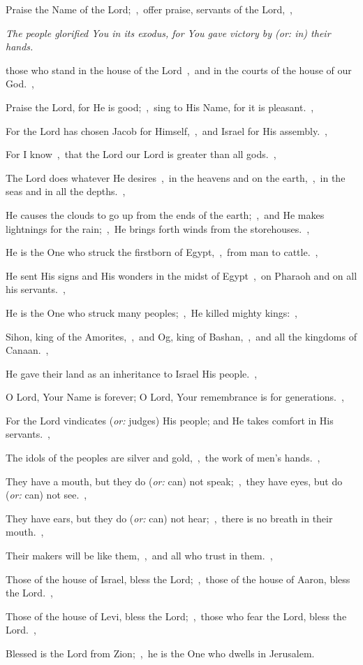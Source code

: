 \documentclass[12pt,twoside,a5paper]{article}
\newcommand{\qanona}[1]{{\liturgicalhint{Qanona.} \emph{#1}}}
\newcommand{\translationoption}[1]{\emph{or:} #1}
\begin{document}
\begin{normalparskip}
  Praise the Name of the Lord;~\sep\ offer praise, servants of the Lord,~\sep

  \qanona{The people glorified You in its exodus, for You gave victory by (\translationoption{in}) their hands.}

  those who stand in the house of the Lord~\sep\ and in the courts of the house of our God.~\sep

  Praise the Lord, for He is good;~\sep\ sing to His Name, for it is pleasant.~\sep

  For the Lord has chosen Jacob for Himself,~\sep\ and Israel for His assembly.~\sep

  For I know~\sep\ that the Lord our Lord is greater than all gods.~\sep

  The Lord does whatever He desires~\sep\ in the heavens and on the earth,~\sep\ in the seas and in all the depths.~\sep

  He causes the clouds to go up from the ends of the earth;~\sep\ and He makes lightnings for the rain;~\sep\ He brings forth winds from the storehouses.~\sep

  He is the One who struck the firstborn of Egypt,~\sep\ from man to cattle.~\sep

  He sent His signs and His wonders in the midst of Egypt~\sep\ on Pharaoh and on all his servants.~\sep

  He is the One who struck many peoples;~\sep\ He killed mighty kings:~\sep

  Sihon, king of the Amorites,~\sep\ and Og, king of Bashan,~\sep\ and all the kingdoms of Canaan.~\sep

  He gave their land as an inheritance to Israel His people.~\sep

  O Lord, Your Name is forever; O Lord, Your remembrance is for generations.~\sep

  For the Lord vindicates (\translationoption{judges}) His people; and He takes comfort in His servants.~\sep

  The idols of the peoples are silver and gold,~\sep\ the work of men's hands.~\sep

  They have a mouth, but they do (\translationoption{can}) not speak;~\sep\ they have eyes, but do (\translationoption{can}) not see.~\sep

  They have ears, but they do (\translationoption{can}) not hear;~\sep\ there is no breath in their mouth.~\sep

  Their makers will be like them,~\sep\ and all who trust in them.~\sep

  Those of the house of Israel, bless the Lord;~\sep\ those of the house of Aaron, bless the Lord.~\sep

  Those of the house of Levi, bless the Lord;~\sep\ those who fear the Lord, bless the Lord.~\sep

  Blessed is the Lord from Zion;~\sep\ he is the One who dwells in Jerusalem.
\end{normalparskip}
\end{document}

